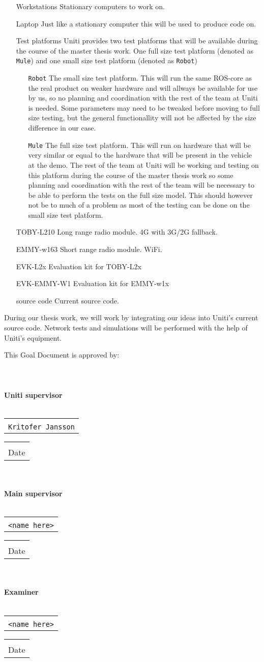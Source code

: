 \documentclass[a4paper]{article}
\makeatletter
\newcommand{\signature}[2]{%
	\noindent%
	\textbf{{#1}}\\\\
	\begin{tabular}{@{}p{2.5in}@{}}
		\\ \hline \\[-.75\normalbaselineskip]
		\texttt{{#2}}
	\end{tabular} \hspace{0in}
	\begin{tabular}{@{}p{2.5in}@{}}
		\\ \hline \\[-.75\normalbaselineskip]
		Date
	\end{tabular}\\
}
\makeatother
\begin{document}
\begin{itemize}
	\item[Workstations] Stationary computers to work on.
	\item[Laptop] Just like a stationary computer this will be used to produce
		code on.
	\item[Test platforms] Uniti provides two test platforms that will be available
		during the course of the master thesis work. One full size test platform
		(denoted as \texttt{Mule}) and one small size test platform (denoted as
		\texttt{Robot})
		\begin{itemize}
			\item[\texttt{Robot}] The small size test platform. This will run the same
				ROS-core as the real product on weaker hardware and will allways be
				available for use by us, so no planning and coordination with the rest
				of the team at Uniti is needed. Some parameters may need to be tweaked
				before moving to full size testing, but the general functionallity will
				not be affected by the size difference in our case.
			\item[\texttt{Mule}] The full size test platform. This will run on
				hardware that will be very similar or equal to the hardware that will be
				present in the vehicle at the demo. The rest of the team at Uniti will
				be working and testing on this platform during the course of the master
				thesis work so some planning and coordination with the rest of the team
				will be necessary to be able to perform the tests on the full size
				model. This should however not be to much of a problem as most of the
				testing can be done on the small size test platform.
		\end{itemize}
	\item[TOBY-L210] Long range radio module. 4G with 3G/2G fallback.
	\item[EMMY-w163] Short range radio module. WiFi.
	\item[EVK-L2x] Evaluation kit for TOBY-L2x
	\item[EVK-EMMY-W1] Evaluation kit for EMMY-w1x
	\item[source code] Current source code.

\end{itemize}

During our thesis work, we will work by integrating our ideas into Uniti's
current source code.
Network tests and simulations will be performed with the help of Uniti's
equipment.



{}



This Goal Document is approved by:\\\\\\\\

\signature{Uniti supervisor}{Kritofer Jansson}\\

\signature{Main supervisor}{<name here>}\\

\signature{Examiner}{<name here>}
\end{document}
